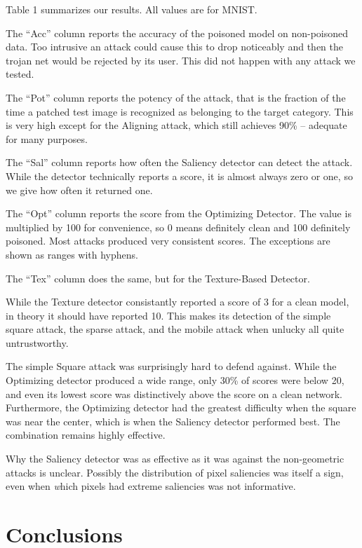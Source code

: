 \documentclass[letterpaper, 10 pt, conference]{ieeeconf}  %
\begin{document}
Table 1 summarizes our results.  All values are for MNIST.

The ``Acc'' column reports the accuracy of the poisoned model on
non-poisoned data.  Too intrusive an attack could cause this to drop
noticeably and then the trojan net would be rejected by its user.
This did not happen with any attack we tested.

The ``Pot'' column reports the potency of the attack, that is the
fraction of the time a patched
test image is recognized as belonging to the target category.  This is
very high except for the Aligning attack, which still achieves 90\% --
adequate for many purposes.

The ``Sal'' column reports how often the Saliency detector can
detect the attack.  While the detector technically reports a score, it
is almost always zero or one, so we give how often it returned one.

The ``Opt'' column reports the score from the Optimizing
Detector.  The value is multiplied by 100 for convenience, so 0 means
definitely clean and 100 definitely poisoned.  Most attacks produced
very consistent scores.  The exceptions are shown as ranges with
hyphens.

The ``Tex'' column does the same, but for the Texture-Based
Detector.

While the Texture detector consistantly reported a score of 3 for a
clean model, in theory it should have reported 10.  This makes its
detection of the simple square attack, the sparse attack, and the
mobile attack when unlucky all quite untrustworthy.

The simple Square attack was surprisingly hard to defend against.
While the Optimizing detector produced a wide range, only 30\% of
scores were below 20, and even its lowest score was distinctively
above the score on a clean network.  Furthermore, the Optimizing
detector had the greatest difficulty when the square was near the
center, which is when the Saliency detector performed best.  The
combination remains highly effective.

Why the Saliency detector was as effective as it was against the
non-geometric attacks is unclear.  Possibly the distribution of pixel
saliencies was itself a sign, even when {\textit which} pixels had
extreme saliencies was not informative.


\section{Conclusions}
\end{document}
